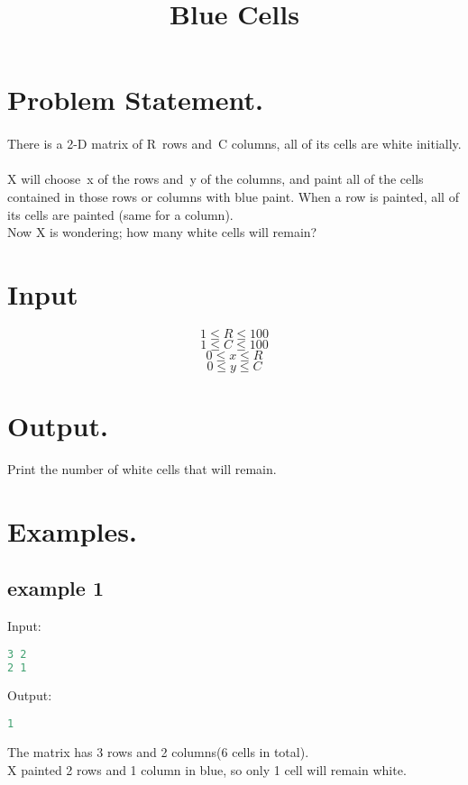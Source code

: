 \documentclass[10pt]{article}
\begin{document}
\title{Blue Cells}
 \date{}
\maketitle
\section{Problem Statement.}
\paragraph{}
There is a 2-D matrix of R rows and C columns, all of its cells are white initially.
\paragraph{}
X will choose x of the rows and y of the columns, and paint all of the cells contained in those rows or columns with blue paint. When a row is painted, all of its cells are painted (same for a column).\\
Now X is wondering; how many white cells will remain?
\section{Input}
$$ 1\le R \le 100 $$
$$ 1\le C \le 100 $$
$$ 0\le x \le R $$
$$ 0\le y \le C $$
\section{Output.}
Print the number of white cells that will remain.
\section{Examples.}
\subsection{example 1}
Input:
\begin{lstlisting}[language=Python]
3 2
2 1
\end{lstlisting}
Output:
\begin{lstlisting}[language=Python]
1
\end{lstlisting}
The matrix has 3 rows and 2 columns(6 cells in total).\\
X painted 2 rows and 1 column in blue, so only 1 cell will remain white.
\end{document}
